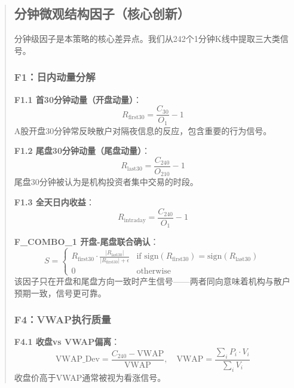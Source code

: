 \documentclass[12pt,a4paper]{article}
\begin{document}
\begin{abstract}
\subsection{分钟微观结构因子（核心创新）}

分钟级因子是本策略的核心差异点。我们从242个1分钟K线中提取三大类信号。

\subsubsection{F1：日内动量分解}

\textbf{F1.1 首30分钟动量（开盘动量）}：
\begin{equation}
    R_{\text{first30}} = \frac{C_{30}}{O_1} - 1
\end{equation}
A股开盘30分钟常反映散户对隔夜信息的反应，包含重要的行为信号。

\textbf{F1.2 尾盘30分钟动量（尾盘动量）}：
\begin{equation}
    R_{\text{last30}} = \frac{C_{240}}{O_{210}} - 1
\end{equation}
尾盘30分钟被认为是机构投资者集中交易的时段。

\textbf{F1.3 全天日内收益}：
\begin{equation}
    R_{\text{intraday}} = \frac{C_{240}}{O_1} - 1
\end{equation}

\textbf{F\_COMBO\_1 开盘-尾盘联合确认}：
\begin{equation}
    S = \begin{cases}
        R_{\text{first30}} \cdot \frac{|R_{\text{last30}}|}{|R_{\text{first30}}| + \epsilon} & \text{if } \text{sign}(R_{\text{first30}}) = \text{sign}(R_{\text{last30}}) \\
        0 & \text{otherwise}
    \end{cases}
\end{equation}
该因子只在开盘和尾盘方向一致时产生信号——两者同向意味着机构与散户预期一致，信号更可靠。

\subsubsection{F4：VWAP执行质量}

\textbf{F4.1 收盘vs VWAP偏离}：
\begin{equation}
    \text{VWAP\_Dev} = \frac{C_{240} - \text{VWAP}}{\text{VWAP}}, \quad \text{VWAP} = \frac{\sum_i P_i \cdot V_i}{\sum_i V_i}
\end{equation}
收盘价高于VWAP通常被视为看涨信号。


\end{abstract}
\end{document}
